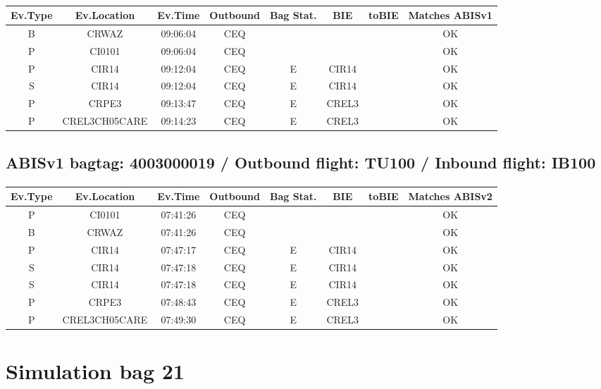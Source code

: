 \documentclass{report}
\begin{document}
\paragraph{}
\begin{longtable}{cccccccc}    \toprule
\rowcolor{white!50}
\textbf{Ev.Type} & \textbf{Ev.Location} & \textbf{Ev.Time} & \textbf{Outbound} & \textbf{Bag Stat.} & \textbf{BIE} & \textbf{toBIE} & \textbf{Matches ABISv1} \\\midrule
B & CRWAZ & 09:06:04  & CEQ &  &  &  & OK\\
P & CI0101 & 09:06:04  & CEQ &  &  &  & OK\\
P & CIR14 & 09:12:04  & CEQ & E & CIR14 &  & OK\\
S & CIR14 & 09:12:04  & CEQ & E & CIR14 &  & OK\\
P & CRPE3 & 09:13:47  & CEQ & E & CREL3 &  & OK\\
P & CREL3CH05CARE & 09:14:23  & CEQ & E & CREL3 &  & OK\\
\bottomrule
\end{longtable}
\subsection*{ABISv1 bagtag: 4003000019 / Outbound flight: TU100 / Inbound flight: IB100}
\paragraph{}
\begin{longtable}{cccccccc}    \toprule
\rowcolor{white!50}
\textbf{Ev.Type} & \textbf{Ev.Location} & \textbf{Ev.Time} & \textbf{Outbound} & \textbf{Bag Stat.} & \textbf{BIE} & \textbf{toBIE} & \textbf{Matches ABISv2} \\\midrule
P & CI0101 & 07:41:26  & CEQ &  &  &  & OK\\
B & CRWAZ & 07:41:26  & CEQ &  &  &  & OK\\
P & CIR14 & 07:47:17  & CEQ & E & CIR14 &  & OK\\
S & CIR14 & 07:47:18  & CEQ & E & CIR14 &  & OK\\
S & CIR14 & 07:47:18  & CEQ & E & CIR14 &  & OK\\
P & CRPE3 & 07:48:43  & CEQ & E & CREL3 &  & OK\\
P & CREL3CH05CARE & 07:49:30  & CEQ & E & CREL3 &  & OK\\
\bottomrule
\end{longtable}
\pagebreak
\section*{Simulation bag 21}
\end{document}
